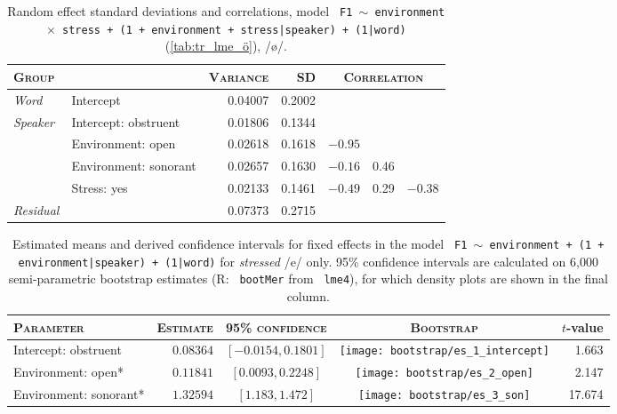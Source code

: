 \begin{table}[H]
  \centering\footnotesize
  \begin{tabular}{llrrrrr}
    \toprule
    \textsc{Group} & \textsc{} & \textsc{Variance} & \textsc{SD} & \multicolumn{3}{c}{\textsc{Correlation}}\\
    \midrule
    \multirow{1}{*}{\textit{Word}} & Intercept & 0.04007 & 0.2002 & & &  \\
    \midrule
    \multirow{4}{*}{\textit{Speaker}} & Intercept: obstruent & 0.01806 &  0.1344  \\
                & Environment: open                        & 0.02618 & 0.1618  & $-0.95$   \\
                & Environment: sonorant                    &0.02657 &  0.1630 & $ -0.16$ & 0.46    \\
                & Stress: yes                              & 0.02133 & 0.1461  & $-0.49$ & 0.29 & $-0.38$ \\
    \midrule
    \textit{Residual} & & 0.07373 & 0.2715 \\
    \bottomrule
  \end{tabular}
  \caption[\texttt{\footnotesize F1 $\sim$ environment$\times$stress + (1 + environment + stress|speaker) + (1|word)}, /e/]{Random effect standard deviations and correlations, model \texttt{ F1 $\sim$ environment $\times$ stress + (1 + environment + stress|speaker) + (1|word)} (\cref{tab:tr_lme_ö}), /ø/.}
  \label{tab:tr_lme_ö_random}
\end{table}

\begin{table}[H]
  \centering\footnotesize
  \begin{tabular}{lrccr}
    \toprule
    \textsc{Parameter} & \textsc{Estimate} & \textsc{95\% confidence} & \textsc{Bootstrap} & $t$-value\\
    \midrule
    Intercept: obstruent & $0.08364$ & $[-0.0154, 0.1801]$ & \texttt{[image: bootstrap/es\_1\_intercept]} & 1.663 \\
    Environment: open* & $0.11841$ & $[0.0093, 0.2248]$ & \texttt{[image: bootstrap/es\_2\_open]} & 2.147\\
    Environment: sonorant* & $1.32594$ & $[1.183, 1.472]$ & \texttt{[image: bootstrap/es\_3\_son]} & 17.674\\
    \bottomrule
  \end{tabular}
  \caption[\texttt{\footnotesize F1 $\sim$ environment + (1 + environment|speaker) + (1|word)}, /e/]{Estimated means and derived confidence intervals for fixed effects in the model \texttt{ F1 $\sim$ environment + (1 + environment|speaker) + (1|word)} for \emph{stressed} /e/ only. 95\% confidence intervals are calculated on 6,000 semi-parametric bootstrap estimates (R: \texttt{ bootMer} from \texttt{ lme4}), for which density plots are shown in the final column. }
  \label{tab:tr_lme_e_stressed}
\end{table}

